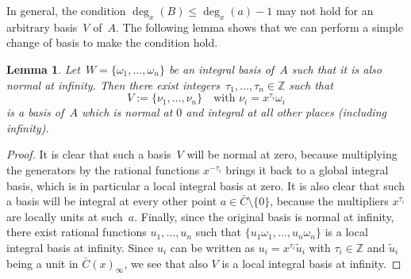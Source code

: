\documentclass{sig-alternate}
\newtheorem{lemma}[theorem]{Lemma}
\let\set\mathbb
\begin{document}
In general, the condition $\deg_x(B) \leq \deg_x(a)-1$ may not hold for an arbitrary basis~$V$ of~$A$.
The following lemma shows that we can perform a simple change of basis to make the condition hold.

\begin{lemma}\label{LM:CB}
Let~$W =\{\omega_1, \ldots, \omega_n\}$ be an integral basis of~$A$ such that it is also normal at infinity. Then
there exist integers~$\tau_1, \ldots, \tau_n\in\set Z$ such that
\[
  V := \{\nu_1, \ldots, \nu_n\} \quad \text{with $\nu_i = x^{\tau_i} \omega_i$}
\]
is a basis of~$A$ which is normal at $0$ and integral at all other places (including infinity).
\end{lemma}
\begin{proof}
It is clear that such a basis~$V$ will be normal at zero, because multiplying the generators by
the rational functions $x^{-\tau_i}$ brings it back to a global integral basis, which is in particular
a local integral basis at zero.
It is also clear that such a basis will be integral at every other point $a\in\bar C\setminus\{0\}$, because the
multipliers $x^{\tau_i}$ are locally units at such~$a$.
Finally, since the original basis is normal at infinity, there exist rational functions $u_1,\dots,u_n$
such that $\{u_1\omega_1,\dots,u_n\omega_n\}$ is a local integral basis at infinity.
Since $u_i$ can be written as $u_i=x^{\tau_i}\tilde{u}_i$ with $\tau_i\in\set Z$ and $\tilde{u}_i$ being a unit
in $\bar{C}(x)_\infty$, we see that also $V$ is a local integral basis at infinity.
\end{proof}
\end{document}
